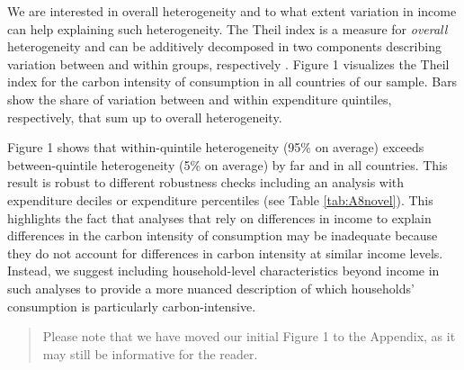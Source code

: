 \documentclass[11pt]{article}
\newenvironment{response}
{\begin{quote}\color{black}}
{\end{quote}}
\begin{document}
\begin{revisionbox}
    We are interested in overall heterogeneity and to what extent variation in income can help explaining such heterogeneity. The Theil index is a measure for \textit{overall} heterogeneity and can be additively decomposed in two components describing variation between and within groups, respectively \autocite{Shorrocks.1980,Cowell.2011a}. Figure 1 visualizes the Theil index for the carbon intensity of consumption in all countries of our sample. Bars show the share of variation between and within expenditure quintiles, respectively, that sum up to overall heterogeneity. 


Figure 1 shows that within-quintile heterogeneity (95\% on average) exceeds between-quintile heterogeneity (5\% on average) by far and in all countries. This result is robust to different robustness checks including an analysis with expenditure deciles or expenditure percentiles (see Table \ref{tab:A8novel}). This highlights the fact that analyses that rely on differences in income to explain differences in the carbon intensity of consumption may be inadequate because they do not account for differences in carbon intensity at similar income levels. Instead, we suggest including household-level characteristics beyond income in such analyses to provide a more nuanced description of which households' consumption is particularly carbon-intensive.

\end{revisionbox}

\begin{response}
    
Please note that we have moved our initial Figure 1 to the Appendix, as it may still be informative for the reader.


\end{response}
\end{document}
